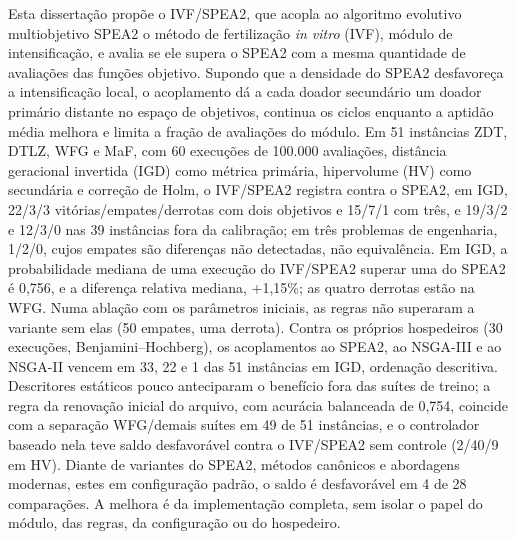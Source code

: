
\begin{resumo}
Esta dissertação propõe o IVF/SPEA2, que acopla ao algoritmo evolutivo multiobjetivo SPEA2 o método de fertilização \textit{in vitro} (IVF), módulo de intensificação, e avalia se ele supera o SPEA2 com a mesma quantidade de avaliações das funções objetivo. Supondo que a densidade do SPEA2 desfavoreça a intensificação local, o acoplamento dá a cada doador secundário um doador primário distante no espaço de objetivos, continua os ciclos enquanto a aptidão média melhora e limita a fração de avaliações do módulo. Em 51 instâncias ZDT, DTLZ, WFG e MaF, com 60 execuções de 100.000 avaliações, distância geracional invertida (IGD) como métrica primária, hipervolume (HV) como secundária e correção de Holm, o IVF/SPEA2 registra contra o SPEA2, em IGD, 22/3/3 vitórias/empates/derrotas com dois objetivos e 15/7/1 com três, e 19/3/2 e 12/3/0 nas 39 instâncias fora da calibração; em três problemas de engenharia, 1/2/0, cujos empates são diferenças não detectadas, não equivalência. Em IGD, a probabilidade mediana de uma execução do IVF/SPEA2 superar uma do SPEA2 é 0,756, e a diferença relativa mediana, +1,15\%; as quatro derrotas estão na WFG. Numa ablação com os parâmetros iniciais, as regras não superaram a variante sem elas (50 empates, uma derrota). Contra os próprios hospedeiros (30 execuções, Benjamini--Hochberg), os acoplamentos ao SPEA2, ao NSGA-III e ao NSGA-II vencem em 33, 22 e 1 das 51 instâncias em IGD, ordenação descritiva. Descritores estáticos pouco anteciparam o benefício fora das suítes de treino; a regra da renovação inicial do arquivo, com acurácia balanceada de 0,754, coincide com a separação WFG/demais suítes em 49 de 51 instâncias, e o controlador baseado nela teve saldo desfavorável contra o IVF/SPEA2 sem controle (2/40/9 em HV). Diante de variantes do SPEA2, métodos canônicos e abordagens modernas, estes em configuração padrão, o saldo é desfavorável em 4 de 28 comparações. A melhora é da implementação completa, sem isolar o papel do módulo, das regras, da configuração ou do hospedeiro.
\end{resumo}
